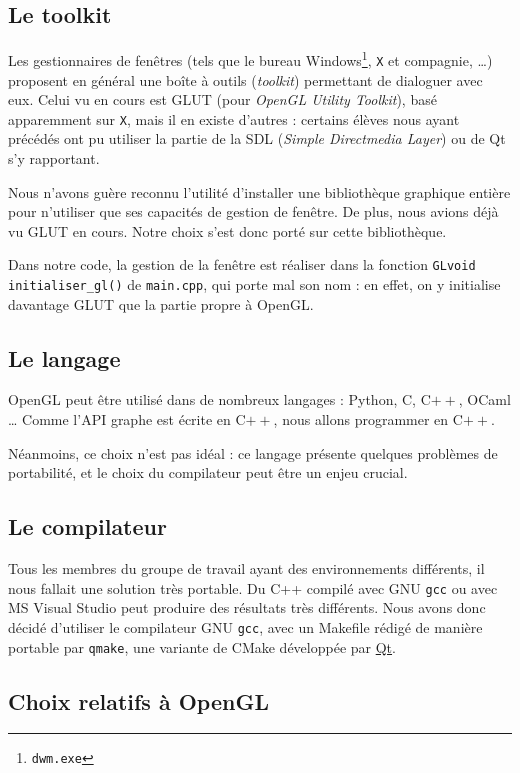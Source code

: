 \documentclass[a4paper, oneside, 11pt, twocolumn]{article}
\begin{document}
\subsection{Le toolkit}

Les gestionnaires de fenêtres (tels que le bureau Windows\footnote{\texttt{dwm.exe}}, \texttt{X} et compagnie, \dots) proposent en général une boîte à outils (\emph{toolkit}) permettant de dialoguer avec eux. Celui vu en cours est GLUT (pour \emph{OpenGL Utility Toolkit}), basé apparemment sur \texttt{X}, mais il en existe d'autres : certains élèves nous ayant précédés ont pu utiliser la partie de la SDL (\emph{Simple Directmedia Layer}) ou de Qt s'y rapportant.

Nous n'avons guère reconnu l'utilité d'installer une bibliothèque graphique entière pour n'utiliser que ses capacités de gestion de fenêtre. De plus, nous avions déjà vu GLUT en cours. Notre choix s'est donc porté sur cette bibliothèque.

Dans notre code, la gestion de la fenêtre est réaliser dans la fonction \texttt{GLvoid initialiser\_gl()} de \texttt{main.cpp}, qui porte mal son nom : en effet, on y initialise davantage GLUT que la partie propre à OpenGL.

\subsection{Le langage}

OpenGL peut être utilisé dans de nombreux langages : Python, C, C$++$, {\tiny OCaml} \dots{} Comme l'API graphe est écrite en C$++$, nous allons programmer en C$++$.

Néanmoins, ce choix n'est pas idéal : ce langage présente quelques problèmes de portabilité, et le choix du compilateur peut être un enjeu crucial.

\subsection{Le compilateur}

Tous les membres du groupe de travail ayant des environnements différents, il nous fallait une solution très portable. Du C++ compilé avec GNU \texttt{gcc} ou avec MS Visual Studio peut produire des résultats très différents. Nous avons donc décidé d'utiliser le compilateur GNU \texttt{gcc}, avec un Makefile rédigé de manière portable par \texttt{qmake}, une variante de CMake développée par \href{http://www.qt.io/}{Qt}.

\subsection{Choix relatifs à OpenGL}
\end{document}
